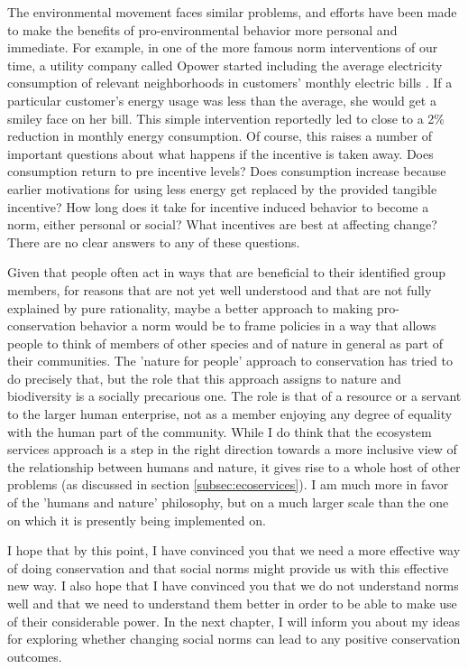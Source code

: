 \documentclass[rutwik_proposal.tex]{subfiles}
\begin{document}
The environmental movement faces similar problems, and efforts have been made to make the benefits of pro-environmental behavior more personal and immediate. For example, in one of the more famous norm interventions of our time, a utility company called Opower started including the average electricity consumption of relevant neighborhoods in customers' monthly electric bills \cite{Allcott11}. If a particular customer's energy usage was less than the average, she would get a smiley face on her bill. This simple intervention reportedly led to close to a 2\% reduction in monthly energy consumption. Of course, this raises a number of important questions about what happens if the incentive is taken away. Does consumption return to pre incentive levels? Does consumption increase because earlier motivations for using less energy get replaced by the provided tangible incentive? How long does it take for incentive induced behavior to become a norm, either personal or social? What incentives are best at affecting change? There are no clear answers to any of these questions.

Given that people often act in ways that are beneficial to their identified group members, for reasons that are not yet well understood and that are not fully explained by pure rationality, maybe a better approach to making pro-conservation behavior a norm would be to frame policies in a way that allows people to think of members of other species and of nature in general as part of their communities. The 'nature for people' approach to conservation has tried to do precisely that, but the role that this approach assigns to nature and biodiversity is a socially precarious one. The role is that of a resource or a servant to the larger human enterprise, not as a member enjoying any degree of equality with the human part of the community. While I do think that the ecosystem services approach is a step in the right direction towards a more inclusive view of the relationship between humans and nature, it gives rise to a whole host of other problems (as discussed in section \ref{subsec:ecoservices}). I am much more in favor of the 'humans and nature' philosophy, but on a much larger scale than the one on which it is presently being implemented on.

I hope that by this point, I have convinced you that we need a more effective way of doing conservation and that social norms might provide us with this effective new way. I also hope that I have convinced you that we do not understand norms well and that we need to understand them better in order to be able to make use of their considerable power. In the next chapter, I will inform you about my ideas for exploring whether changing social norms can lead to any positive conservation outcomes.
\end{document}
